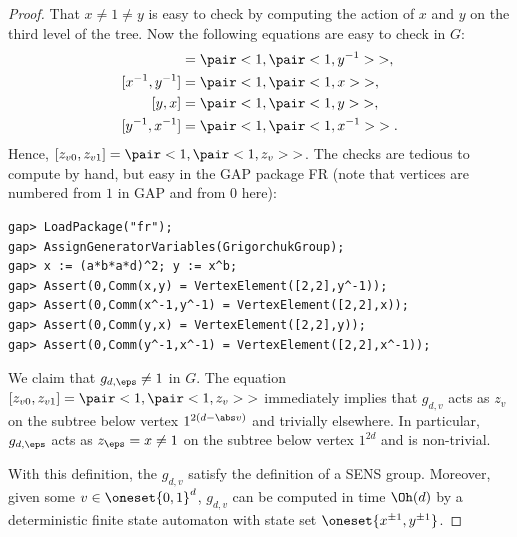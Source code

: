\begin{proof}
  That $x\neq1 \neq y$ is easy to check by computing the action of $x$ and $y$ on the
  third level of the tree.
  Now the following equations are easy to check in $G$:
  \begin{align*}
    [x,y] &= \pair<1,{\pair<1,y^{-1}>}>,  \\ 
    [x^{-1},y^{-1}] &= \pair<1,{\pair<1,x>}>,  \\ 
    [y,x] &= \pair<1,{\pair<1,y>}>,  \\ 
    [y^{-1},x^{-1}] &= \pair<1,{\pair<1,x^{-1}>}>.  
  \end{align*}
  Hence, $[z_{v0},z_{v1}] = \pair<1,{\pair<1,z_v>}>$.
  The checks are tedious to compute by hand, but easy in the GAP
  package FR (note that vertices are numbered from $1$ in GAP and from
  $0$ here):
\begin{verbatim}
gap> LoadPackage("fr");
gap> AssignGeneratorVariables(GrigorchukGroup);
gap> x := (a*b*a*d)^2; y := x^b;
gap> Assert(0,Comm(x,y) = VertexElement([2,2],y^-1));
gap> Assert(0,Comm(x^-1,y^-1) = VertexElement([2,2],x));
gap> Assert(0,Comm(y,x) = VertexElement([2,2],y));
gap> Assert(0,Comm(y^-1,x^-1) = VertexElement([2,2],x^-1));
\end{verbatim}
  We claim that $g_{d,\eps} \neq 1$ in $G$. The equation  $[z_{v0},z_{v1}] = \pair<1,{\pair<1,z_v>}>$
  immediately implies that $g_{d,v}$ acts as $z_v$ on the subtree
  below vertex $1^{2(d-\abs v)}$
  and trivially elsewhere. In particular,
  $g_{d,\eps}$ acts as $z_\eps=x \neq 1$ on the subtree below vertex
  $1^{2d}$ and is non-trivial.
 	
  With this definition, the $g_{d,v}$ satisfy the definition of a SENS group. 
  Moreover, given some $v\in \oneset{0,1}^d$, $g_{d,v}$ can be
  computed in time $\Oh(d)$ by a deterministic finite state automaton with state set 
  $\oneset{x^{\pm1},y^{\pm1}}$.
\end{proof}

